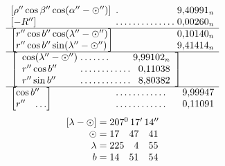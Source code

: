 \[
\begin{array}{l@{\;}l@{\;}r}
[\rho''\cos\beta''\cos(\alpha''-\odot'')]&\mathord{.}&9{,}40991_n\\
{}[-R'']&\mathord{.}\,\mathord{.}\,\mathord{.}\,\mathord{.}\,\mathord{.}\,\mathord{.}\,\mathord{.}\,\mathord{.}\,\mathord{.}\,\mathord{.}\,\mathord{.}\,\mathord{.}\,\mathord{.}\,\mathord{.}&0{,}00260_n\\\hline
\left[\begin{array}{@{}l@{}}r''\cos b''\cos(\lambda''-\odot'')\\r''\cos b''\sin(\lambda''-\odot'')\end{array}\right]&&
\begin{array}{@{}r@{}}0{,}10140_n\\9{,}41414_n\end{array}\\\hline
\multicolumn{3}{l}{\left[\begin{array}{l@{\;}l@{\;}r}
\cos(\lambda''-\odot'')&\mathord{.}\,\mathord{.}\,\mathord{.}\,\mathord{.}\,\mathord{.}\,\mathord{.}\,\mathord{.}&9{,}99102_n\\
r''\cos b''&\mathord{.}\,\mathord{.}\,\mathord{.}\,\mathord{.}\,\mathord{.}\,\mathord{.}\,\mathord{.}\,\mathord{.}\,\mathord{.}\,\mathord{.}\,\mathord{.}\,\mathord{.}&0{,}11038\\
r''\sin b''&\mathord{.}\,\mathord{.}\,\mathord{.}\,\mathord{.}\,\mathord{.}\,\mathord{.}\,\mathord{.}\,\mathord{.}\,\mathord{.}\,\mathord{.}\,\mathord{.}\,\mathord{.}&8{,}80382
\end{array}\right]}\\\hline
\left[\begin{array}{@{}l@{}}\cos b''\\r''\quad\mathord{.}\,\mathord{.}\,\mathord{.}\end{array}\right]&
\begin{array}{@{}l@{}}\mathord{.}\,\mathord{.}\,\mathord{.}\,\mathord{.}\,\mathord{.}\,\mathord{.}\,\mathord{.}\,\mathord{.}\,\mathord{.}\,\mathord{.}\,\mathord{.}\,\mathord{.}\\\mathord{.}\,\mathord{.}\,\mathord{.}\,\mathord{.}\,\mathord{.}\,\mathord{.}\,\mathord{.}\,\mathord{.}\,\mathord{.}\,\mathord{.}\,\mathord{.}\,\mathord{.}\end{array}&
\begin{array}{@{}r@{}}9{,}99947\\0{,}11091\end{array}
\end{array}
\]
\[
\begin{array}{r@{\;}l}
[\lambda-\odot]=&207^{0}\,17'\,14''\\
\odot=&17\quad47\quad41\\
\lambda=&225\quad4\quad55\\
b=&14\quad51\quad54
\end{array}
\]

